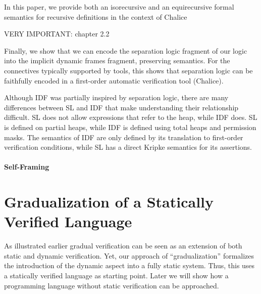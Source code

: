 \cite{summers2013formal}
In this paper, we provide both an isorecursive and an equirecursive formal
semantics for recursive definitions in the context of Chalice

\cite{parkinson2011relationship}
VERY IMPORTANT: chapter 2.2

Finally, we show that we can encode the separation
logic fragment of our logic into the implicit dynamic frames fragment, preserving
semantics. For the connectives typically supported by tools, this shows that separation
logic can be faithfully encoded in a first-order automatic verification tool (Chalice).

Although IDF was partially inspired by separation logic, there are many differences
between SL and IDF that make understanding their relationship difficult. SL does not
allow expressions that refer to the heap, while IDF does. SL is defined on partial heaps,
while IDF is defined using total heaps and permission masks. The semantics of IDF are only defined by its translation to first-order verification conditions, while SL has a direct
Kripke semantics for its assertions.

\subsubsection{Self-Framing}





\chapter{Gradualization of a Statically Verified Language}
As illustrated earlier %
gradual verification can be seen as an extension of both static and dynamic verification.
Yet, our approach of “gradualization” formalizes the introduction of the dynamic aspect into a fully static system.
Thus, this %
uses a statically verified language as starting point.
Later %
we will show how a programming language without static verification can be approached.

